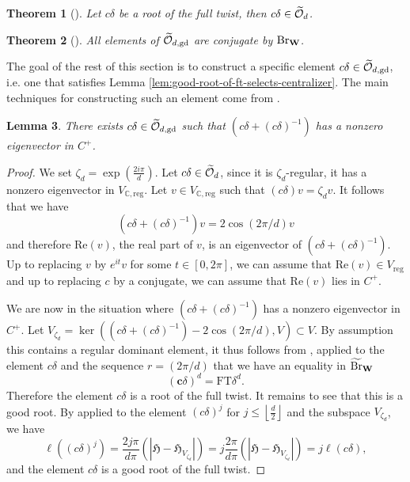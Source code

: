 \documentclass[article, 10pt, oneside, reqno]{amsart}
\theoremstyle{plain}
\newtheorem{thm}{Theorem}[subsection]
\newtheorem{lem}[thm]{Lemma}
\theoremstyle{definition}
\theoremstyle{remark}
\newcommand{\FT}{\mathrm{FT}}
\newcommand{\C}{\mathbb{C}}
\newcommand{\reg}{\mathrm{reg}}
\newcommand{\gd}{\mathrm{gd}}
\newcommand{\Hfrak}{\mathfrak{H}}
\newcommand{\cbf}{\mathbf{c}}
\begin{document}
\begin{thm}[]
Let $c\delta$ be a root of the full twist, then $c\delta \in \widetilde{\mathcal{O}}_d$.
\end{thm}

\begin{thm}[]\label{thm:all-good-roots-are-conjugate}
All elements of $\widetilde{\Ocal}_{d,\gd}$ are conjugate by $\mathrm{Br}_{\mathbf{W}}$.
\end{thm}

The goal of the rest of this section is to construct a specific element $c\delta \in \widetilde{\Ocal}_{d,\gd}$, i.e. one that satisfies Lemma \ref{lem:good-root-of-ft-selects-centralizer}. The main techniques for constructing such an element come from \cite{HeNie}.

\begin{lem}\label{lem:eigenvector-in-dominant-chamber}
There exists $c\delta \in \widetilde{\Ocal}_{d,\gd}$ such that $(c\delta + (c\delta)^{-1})$ has a nonzero eigenvector in $C^+$.
\end{lem}

\begin{proof}
We set $\zeta_d = \exp(\frac{2i\pi}{d})$. Let $c\delta \in \widetilde{\mathcal{O}}_{d}$, since it is $\zeta_d$-regular, it has a nonzero eigenvector in $V_{\C, \reg}$. Let $v \in V_{\C, \reg}$ such that $(c\delta)v = \zeta_dv$. It follows that we have 
$$(c\delta + (c\delta)^{-1})v = 2\cos(2\pi/d)v$$
and therefore $\mathrm{Re}(v)$, the real part of $v$, is an eigenvector of $(c\delta + (c\delta)^{-1})$. Up to replacing $v$ by $e^{it}v$ for some $t \in [0, 2\pi]$, we can assume that $\mathrm{Re}(v) \in V_{\reg}$ and up to replacing $c$ by a conjugate, we can assume that $\mathrm{Re}(v)$ lies in $C^+$. 

We are now in the situation where $(c\delta + (c\delta)^{-1})$ has a nonzero eigenvector in $C^+$. Let $V_{\zeta_d} = \ker((c\delta + (c\delta)^{-1}) - 2\cos(2\pi/d), V) \subset V$. By assumption this contains a regular dominant element, it thus follows from \cite[Theorem 5.2]{HeNie}, applied to the element $c\delta$ and the sequence $r = (2\pi/d)$ that we have an equality in $\widetilde{\mathrm{Br}}_{\mathbf{W}}$
$$(\cbf\delta)^d = \FT \delta^d.$$
Therefore the element $c\delta$ is a root of the full twist. It remains to see that this is a good root. By \cite[Lemma 2.1]{HeNie} applied to the element $(c\delta)^j$ for $j \leq  \left\lfloor \frac{d}{2} \right\rfloor$ and the subspace $V_{\zeta_d}$, we have 
$$\ell((c\delta)^j) = \frac{2j\pi}{d\pi}(|\Hfrak - \Hfrak_{V_{\zeta_d}}|) = j\frac{2\pi}{d\pi}(|\Hfrak - \Hfrak_{V_{\zeta_d}}|) = j\ell(c\delta),$$
and the element $c\delta$ is a good root of the full twist.
\end{proof}
\end{document}
